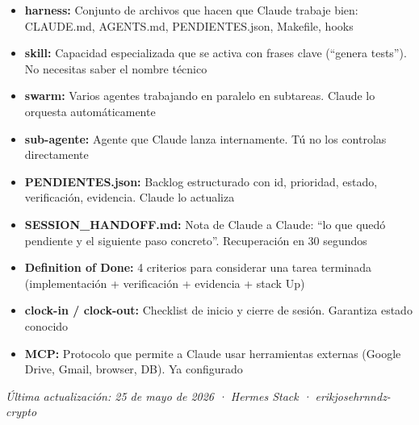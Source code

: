 \documentclass[11pt,a4paper,spanish]{article}
\begin{document}
\begin{itemize}
  \item \textbf{harness:} Conjunto de archivos que hacen que Claude trabaje bien: CLAUDE.md, AGENTS.md, PENDIENTES.json, Makefile, hooks

  \item \textbf{skill:} Capacidad especializada que se activa con frases clave (``genera tests''). No necesitas saber el nombre técnico

  \item \textbf{swarm:} Varios agentes trabajando en paralelo en subtareas. Claude lo orquesta automáticamente

  \item \textbf{sub-agente:} Agente que Claude lanza internamente. Tú no los controlas directamente

  \item \textbf{PENDIENTES.json:} Backlog estructurado con id, prioridad, estado, verificación, evidencia. Claude lo actualiza

  \item \textbf{SESSION\_HANDOFF.md:} Nota de Claude a Claude: ``lo que quedó pendiente y el siguiente paso concreto''. Recuperación en 30 segundos

  \item \textbf{Definition of Done:} 4 criterios para considerar una tarea terminada (implementación + verificación + evidencia + stack Up)

  \item \textbf{clock-in / clock-out:} Checklist de inicio y cierre de sesión. Garantiza estado conocido

  \item \textbf{MCP:} Protocolo que permite a Claude usar herramientas externas (Google Drive, Gmail, browser, DB). Ya configurado
\end{itemize}

\vspace{1cm}

\noindent\hrulefill

\noindent\small\textit{Última actualización: 25 de mayo de 2026 · Hermes Stack · erikjosehrnndz-crypto}
\end{document}
